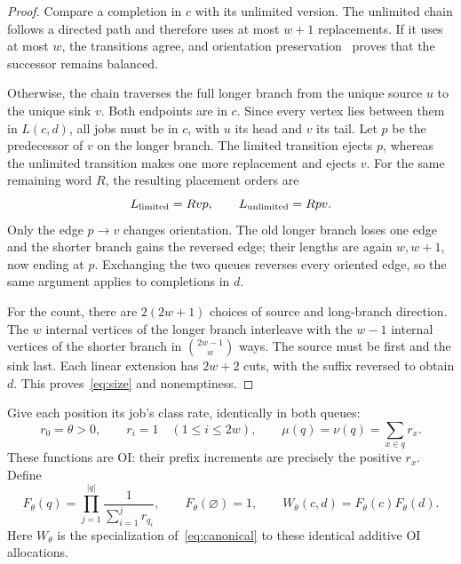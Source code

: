 \documentclass[11pt]{article}
\theoremstyle{remark}
\newcommand{\W}{W_\theta}
\newcommand{\F}{F_\theta}
\newcommand{\emptyq}{\varnothing}
\begin{document}
\begin{proof}
Compare a completion in $c$ with its unlimited version. The unlimited chain follows a directed path and therefore uses at most $w+1$ replacements. If it uses at most $w$, the transitions agree, and orientation preservation~\cite[Lemma~1, p.~217]{DG} proves that the successor remains balanced.

Otherwise, the chain traverses the full longer branch from the unique source $u$ to the unique sink $v$. Both endpoints are in $c$. Since every vertex lies between them in $L(c,d)$, all jobs must be in $c$, with $u$ its head and $v$ its tail. Let $p$ be the predecessor of $v$ on the longer branch. The limited transition ejects $p$, whereas the unlimited transition makes one more replacement and ejects $v$. For the same remaining word $R$, the resulting placement orders are
\[
 L_{\rm limited}=Rvp,\qquad L_{\rm unlimited}=Rpv.
\]
Only the edge $p\to v$ changes orientation. The old longer branch loses one edge and the shorter branch gains the reversed edge; their lengths are again $w,w+1$, now ending at $p$. Exchanging the two queues reverses every oriented edge, so the same argument applies to completions in $d$.

For the count, there are $2(2w+1)$ choices of source and long-branch direction. The $w$ internal vertices of the longer branch interleave with the $w-1$ internal vertices of the shorter branch in $\binom{2w-1}{w}$ ways. The source must be first and the sink last. Each linear extension has $2w+2$ cuts, with the suffix reversed to obtain $d$. This proves~\eqref{eq:size} and nonemptiness.
\end{proof}

Give each position its job's class rate, identically in both queues:
\begin{equation}\label{eq:rates}
 r_0=\theta>0,\qquad r_i=1\quad(1\le i\le2w),\qquad
 \mu(q)=\nu(q)=\sum_{x\in q}r_x.
\end{equation}
These functions are OI: their prefix increments are precisely the positive $r_x$. Define
\begin{equation}\label{eq:weights}
 \F(q)=\prod_{j=1}^{|q|}\frac{1}{\sum_{i=1}^{j}r_{q_i}},\qquad
 \F(\emptyq)=1,\qquad \W(c,d)=\F(c)\F(d).
\end{equation}
Here $W_\theta$ is the specialization of~\eqref{eq:canonical} to these identical additive OI allocations.
\end{document}
